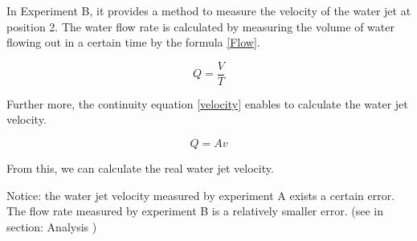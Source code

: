 In Experiment B, it provides a method to measure the velocity of the water jet at position 2. 
The water flow rate is calculated by measuring the volume of water flowing out in a certain time 
by the formula \eqref{Flow}.

\begin{equation}
\label{Flow}
Q=\frac{V}{T}
\end{equation}

Further more, the continuity equation \eqref{velocity} enables to calculate the water jet velocity.

\begin{equation}
\label{velocity}
Q=Av
\end{equation}

From this, we can calculate the real water jet velocity.

Notice:  the water jet velocity measured by experiment A exists a 
certain error.
The flow rate measured by experiment B is a relatively smaller error.
(see in section: Analysis %
)